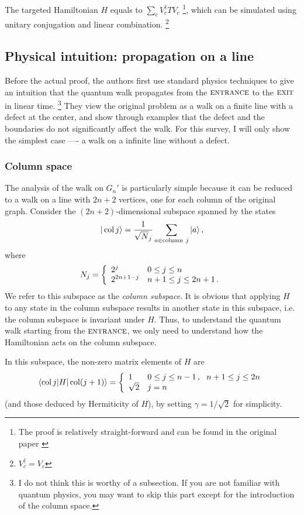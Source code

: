 \documentclass[aps,11pt,twoside,nofootinbib,tightenlines,superscriptaddress,preprintnumbers]{revtex4}
\makeatletter
\newcommand{\<}{\langle}
\renewcommand{\>}{\rangle}
\newcommand{\be}{\begin{equation}}
\newcommand{\ee}{\end{equation}}
\newcommand{\cond}[1]{\left\{\begin{array}{l@{~~~}l}#1\end{array}\right.}
\newcommand{\ent}{{\textsc{entrance}}}
\newcommand{\exit}{{\textsc{exit}}}
\newcommand{\col}{\mathop{\mathrm{col}}\nolimits}
\newenvironment{proof sketch}
{\trivlist\item\noindent{\bf Proof sketch}~}
{\qed\endtrivlist}
\makeatother
\begin{document}
The targeted Hamiltonian $H$ equals to $\sum_c V_c^\dag T V_c$ \footnote{The proof is relatively straight-forward and can be found in the original paper \cite{EXP03}}, which can be simulated using unitary conjugation and linear combination. \footnote{$V_c^\dag = V_c$}

\subsection{Physical intuition: propagation on a line}\label{subsec:line}

Before the actual proof, the authors first use standard physics techniques to give an intuition that the quantum walk propagates from the $\ent$ to the $\exit$ in linear time. \footnote{I do not think this is worthy of a subsection. If you are not familiar with quantum physics, you may want to skip this part except for the introduction of the column space.} They view the original problem as a walk on a finite line with a defect at the center, and show through examples that the defect and the boundaries do not significantly affect the walk. For this survey, I will only show the simplest case ---- a walk on a infinite line without a defect.

\subsubsection{Column space}

The analysis of the walk on $G_n'$ is particularly simple because it can
be reduced to a walk on a line with $2n+2$ vertices, one for each column
of the original graph.  Consider the $(2n+2)$-dimensional subspace spanned
by the states
\be
  |\col j\> = {1 \over \sqrt N_j} \sum_{a \in \mathrm{column~} j} |a\>
\,,
\ee
where
\be
  N_j = \cond{2^j        &   0 \le j \le n \\
              2^{2n+1-j} & n+1 \le j \le 2n+1 \,.}
\ee
We refer to this subspace as the {\em column subspace}. It is obvious that applying $H$ to any state in the column subspace results in another state in this subspace, i.e. the column subspace is
invariant under $H$. Thus, to understand the quantum walk starting from the $\ent$, we only need to understand how the Hamiltonian acts on the column subspace.

In this subspace, the non-zero matrix elements of $H$ are
\be
  \<\col j|H|\col(j+1)\> = \cond{
   1 & 0 \le j \le n-1 \,,~~ n+1 \le j \le 2n \\
  \sqrt 2       & j=n}
\label{eq:lineham}
\ee 
(and those deduced by Hermiticity of $H$), by setting $\gamma=1/\sqrt2$ for simplicity.
\end{document}
